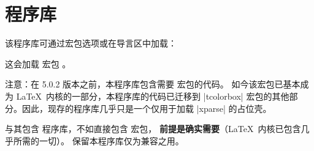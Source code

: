 \clearpage
\section{程序库 }\label{sec:xparse}%
%
该程序库可通过宏包选项或在导言区中加载：
\begin{dispListing}
\end{dispListing}
这会加载  宏包 \cite{latexproject:xparse}。

注意：在 5.0.2 版本之前，本程序库包含需要  宏包的代码。
如今该宏包已基本成为 \LaTeX\ 内核的一部分，本程序库的代码已迁移到
|tcolorbox| 宏包的其他部分。因此，现存的程序库几乎只是一个仅用于加载
|xparse| 的占位壳。

与其包含  程序库，不如直接包含  宏包，
\textbf{前提是确实需要}（\LaTeX\ 内核已包含几乎所需的一切）。
保留本程序库仅为兼容之用。
